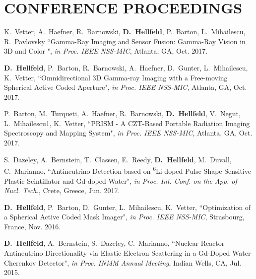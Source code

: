 \section{\small{CONFERENCE PROCEEDINGS}}

 \begin{thebibliography}{3}
 \raggedright
 \vspace{10pt}


 K.~Vetter, A.~Haefner, R.~Barnowski, \textbf{D.~Hellfeld}, P.~Barton, L.~Mihailescu, R.~Pavlovsky ``Gamma-Ray Imaging and Sensor Fusion: Gamma-Ray Vision in 3D and Color ", \emph{in Proc. IEEE NSS-MIC}, Atlanta, GA, Oct. 2017. %

 \textbf{D.~Hellfeld}, P.~Barton, R.~Barnowski, A.~Haefner, D.~Gunter, L.~Mihailescu, K.~Vetter, ``Omnidirectional 3D Gamma-ray Imaging with a Free-moving Spherical Active Coded Aperture", \emph{in Proc. IEEE NSS-MIC}, Atlanta, GA, Oct. 2017. %

 P.~Barton, M.~Turqueti, A.~Haefner, R.~Barnowski, \textbf{D.~Hellfeld}, V.~Negut, L.~Mihailescu1, K.~Vetter, ``PRISM - A CZT-Based Portable Radiation Imaging Spectroscopy and Mapping System", \emph{in Proc. IEEE NSS-MIC}, Atlanta, GA, Oct. 2017. 

  S.~Dazeley, A.~Bernstein, T.~Classen, E.~Reedy, \textbf{D.~Hellfeld}, M.~Duvall, C.~Marianno, ``Antineutrino Detection based on \textsuperscript{6}Li-doped Pulse Shape Sensitive Plastic Scintillator and Gd-doped Water", \emph{in Proc. Int. Conf. on the App. of Nucl. Tech.}, Crete, Greece, Jun. 2017. %
 
  \textbf{D.~Hellfeld}, P.~Barton, D.~Gunter, L.~Mihailescu, K.~Vetter, ``Optimization of a Spherical Active Coded Mask Imager", \emph{in Proc. IEEE NSS-MIC}, Strasbourg, France, Nov. 2016. %
 
 
  \textbf{D.~Hellfeld}, A.~Bernstein, S.~Dazeley, C.~Marianno, ``Nuclear Reactor Antineutrino Directionality via Elastic Electron Scattering in a Gd-Doped Water Cherenkov Detector", \emph{in Proc. INMM Annual Meeting}, Indian Wells, CA, Jul. 2015. %

 \end{thebibliography}
